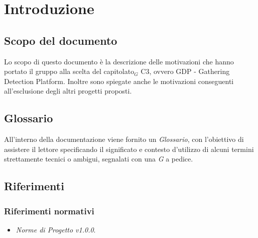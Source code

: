 \chapter{Introduzione} \label{Introduzione}

\section{Scopo del documento} \label{ScopoDelDocumento}
Lo scopo di questo documento è la descrizione delle motivazioni che hanno portato il gruppo alla scelta del capitolato$_G$ C3, ovvero GDP - Gathering Detection Platform. Inoltre sono spiegate anche le motivazioni conseguenti all'esclusione degli altri progetti proposti.

\section{Glossario} \label{Glossario}
All'interno della documentazione viene fornito un \textit{Glossario}, con l'obiettivo di assistere il lettore specificando il significato e contesto d'utilizzo di alcuni termini strettamente tecnici o ambigui, segnalati con una \textit{G} a pedice.

\section{Riferimenti} \label{Riferimenti}
\subsection{Riferimenti normativi} \label{RiferimentiNormativi}
\begin{itemize}
	\item \textit{Norme di Progetto v1.0.0}.
\end{itemize}
